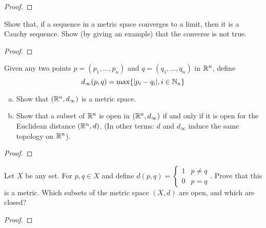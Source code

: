 \documentclass[./main.tex]{subfiles}
\begin{document}
\begin{proof}
\end{proof}

\begin{fprob}
    Show that, if a sequence in a metric space converges to a limit, then it is a Cauchy
    sequence. Show (by giving an example) that the converse is not true.
\end{fprob}

\begin{proof}
\end{proof}

\begin{fprob}
    Given any two points $p = (p_1,\dots,p_n)$ and $q = (q_1,\dots, q_n)$ in $\mathbb{R}^n$, define
    \[
        d_\infty(p,q) = \max\{|p_i-q_i|, i\in\mathbb{N}_n\}  
    \]
    \begin{enumerate}[(a)]
        \item Show that $(\mathbb{R}^n,d_\infty)$ is a metric space.
        \item Show that a subset of $\mathbb{R}^n$ is open in $(\mathbb{R}^n,d_\infty)$ if and only if it is open 
        for the Euclidean distance $(\mathbb{R}^n,d)$. (In other terms: $d$ and $d_\infty$ induce the same 
        topology on $\mathbb{R}^n$).
    \end{enumerate}
\end{fprob}

\begin{proof}
\end{proof}


\begin{fprob}
    Let $X$ be any set. For $p,q\in X$ and define $d(p,q)=\begin{cases} 1 & p\neq q \\ 0 & p=q\end{cases}$.
    Prove that this is a metric. Which subsets of the metric space $(X,d)$ are open, and which are closed?
\end{fprob}

\begin{proof}
\end{proof}
\end{document}
